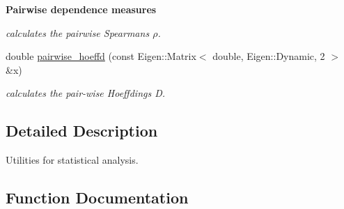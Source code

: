 \begin{Indent}{\bf Pairwise dependence measures}
\begin{DoxyCompactItemize}
\begin{DoxyCompactList}\small\item\em calculates the pairwise Spearman\textquotesingle{}s $ \rho $. \end{DoxyCompactList}\item 
double \hyperlink{namespacevinecopulib_1_1tools__stats_a2dae5e063461728f92eae5e6e346fdd3}{pairwise\+\_\+hoeffd} (const Eigen\+::\+Matrix$<$ double, Eigen\+::\+Dynamic, 2 $>$ \&x)\hypertarget{namespacevinecopulib_1_1tools__stats_a2dae5e063461728f92eae5e6e346fdd3}{}\label{namespacevinecopulib_1_1tools__stats_a2dae5e063461728f92eae5e6e346fdd3}

\begin{DoxyCompactList}\small\item\em calculates the pair-\/wise Hoeffding\textquotesingle{}s D. \end{DoxyCompactList}\end{DoxyCompactItemize}
\end{Indent}


\subsection{Detailed Description}
Utilities for statistical analysis. 

\subsection{Function Documentation}
